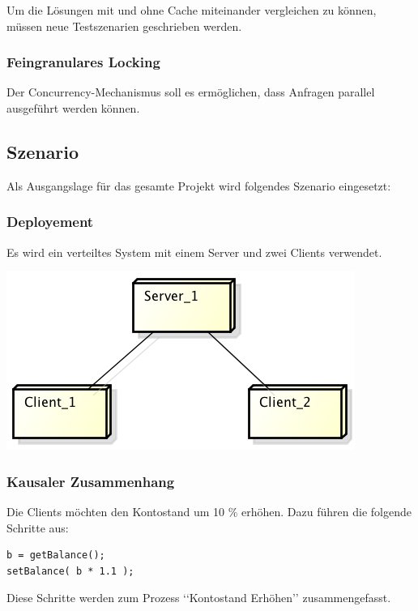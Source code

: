 \documentclass{article}
\begin{document}
Um die Lösungen mit und ohne Cache miteinander vergleichen zu können, müssen neue Testszenarien geschrieben werden.

\subsubsection{Feingranulares Locking}
\label{sec:feingr-lock}

Der Concurrency-Mechanismus soll es ermöglichen, dass Anfragen parallel ausgeführt werden können.

\subsection{Szenario}
\label{sec:szenario}

Als Ausgangslage für das gesamte Projekt wird folgendes Szenario eingesetzt:

\subsubsection{Deployement}
\label{sec:deployement}

Es wird ein verteiltes System mit einem Server und zwei Clients verwendet.
\begin{center}
\includegraphics[scale=0.85]{Deployment.png}
\end{center}

\subsubsection{Kausaler Zusammenhang}
\label{sec:kaus-zusamm}

Die Clients möchten den Kontostand um 10 \% erhöhen. Dazu führen die folgende Schritte aus:
\begin{lstlisting}
b = getBalance();
setBalance( b * 1.1 );
\end{lstlisting}
Diese Schritte werden zum Prozess ‘‘Kontostand Erhöhen’’ zusammengefasst.
\end{document}
